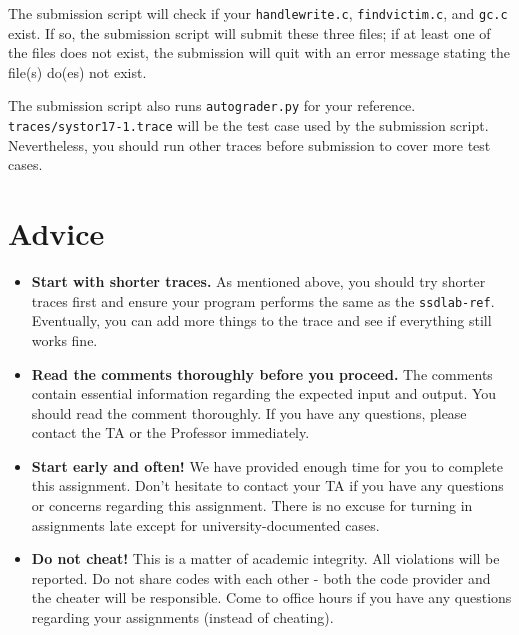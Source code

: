 \documentclass[11pt]{article}
\begin{document}
The submission script will check if your \texttt{handlewrite.c}, \texttt{findvictim.c}, and \texttt{gc.c} exist. If so, the submission script will submit these three files; if at least one of the files does not exist, the submission will quit with an error message stating the file(s) do(es) not exist.

The submission script also runs \texttt{autograder.py} for your reference. 
\texttt{traces/systor17-1.trace} will be the test case used by the submission script.
Nevertheless, you should run other traces before submission to cover more test cases.

\section{Advice}

\begin{itemize}
    \item \textbf{Start with shorter traces.} As mentioned above, you should try shorter traces first and ensure your program performs the same as the \texttt{ssdlab-ref}. Eventually, you can add more things to the trace and see if everything still works fine.
    \item \textbf{Read the comments thoroughly before you proceed.} 
    The comments contain essential information regarding the expected input and output. You should read the comment thoroughly. If you have any questions, please contact the TA or the Professor immediately.
    \item \textbf{Start early and often!} We have provided enough time for you to complete this assignment. Don't hesitate to contact your TA if you have any questions or concerns regarding this assignment. There is no excuse for turning in assignments late except for university-documented cases.
    \item \textbf{Do not cheat!} This is a matter of academic integrity. All violations will be reported. Do not share codes with each other - both the code provider and the cheater will be responsible. Come to office hours if you have any questions regarding your assignments (instead of cheating).
\end{itemize}
\end{document}
